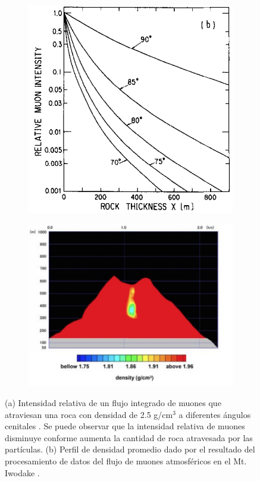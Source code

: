 \documentclass[12pt,oneside,openany,letter]{book}
\begin{document}
\begin{figure}[h]
\begin{subfigure}{0.4\textwidth}
\includegraphics[width=\textwidth]{images/muon_intesity.png}
\caption{}
\label{muon_intensity}
\end{subfigure}
\begin{subfigure}{0.6\textwidth}
\includegraphics[width=\textwidth]{images/perfil.jpg}
\caption{}
\label{perfil}
\end{subfigure}
 \caption[Intensidad de muones que penetran una roca con densidad conocida]{(a) Intensidad relativa de un flujo integrado de muones que atraviesan una roca con densidad de 2.5 g/cm$^3$ a diferentes ángulos cenitales \cite{Nagamine-etal1995}. Se puede observar que la intensidad relativa de muones disminuye conforme aumenta la cantidad de roca atravesada por las partículas. (b) Perfil de densidad promedio dado por el resultado del procesamiento de datos del flujo de muones atmosféricos en el Mt. Iwodake \cite{Tanaka-etal2009}.}
  \label{figura1}
\end{figure}
\end{document}

